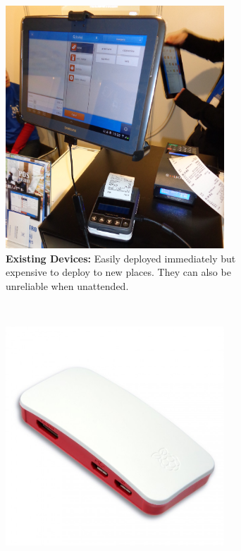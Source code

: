 \begin{figure}[h]
    \centering
    \begin{subfigure}[t]{0.3\textwidth}
        \centering
        \includegraphics[width=0.9\textwidth]{figs/POS.jpg}
        \caption{\textbf{Existing Devices:} Easily deployed immediately but expensive to deploy to new places. They can also be unreliable when unattended.}
    \end{subfigure}
    ~
    \begin{subfigure}[t]{0.3\textwidth}
        \centering
        \includegraphics[width=0.9\textwidth]{figs/RaspberryPi.png}

\end{subfigure}
\end{figure}
